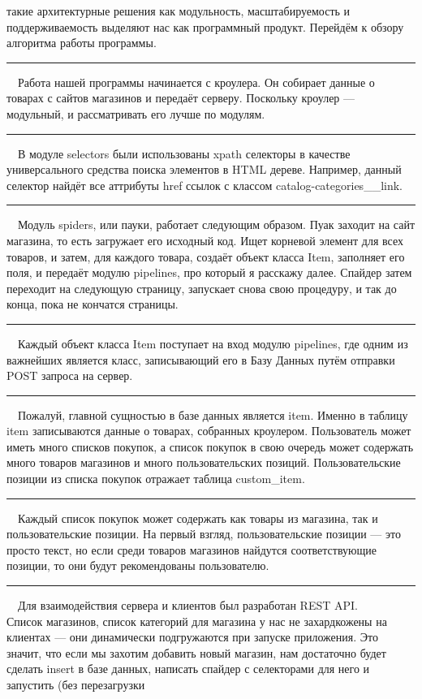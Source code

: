 \documentclass[12pt]{article}
\renewcommand{\line}{\noindent\rule{\textwidth}{1pt}}
\begin{document}
такие архитектурные решения как модульность, масштабируемость и
поддерживаемость выделяют нас как программный продукт. Перейдём к обзору
алгоритма работы программы.\\
\line\
\kir\ Работа нашей программы начинается с кроулера. Он собирает данные о товарах с
сайтов магазинов и передаёт серверу. Поскольку кроулер --- модульный, и
рассматривать его лучше по модулям.\\
\line\
\kir\ В модуле selectors были использованы xpath селекторы в качестве
универсального средства поиска элементов в HTML дереве. Например, данный
селектор найдёт все аттрибуты href ссылок с классом {\scriptsize
catalog-categories\_\_link}.\\
\line\
\kir\ Модуль spiders, или пауки, работает следующим образом. Пуак заходит на
сайт магазина, то есть загружает его исходный код. Ищет корневой элемент для
всех товаров, и затем, для каждого товара, создаёт объект класса Item,
заполняет его поля, и передаёт модулю pipelines, про который я расскажу далее.
Спайдер затем переходит на следующую страницу, запускает снова свою процедуру,
и так до конца, пока не кончатся страницы.\\
\line\
\kir\ Каждый объект класса Item поступает на вход модулю pipelines, где одним из
важнейших является класс, записывающий его в Базу Данных путём отправки
POST запроса на сервер.\\
\line\
\max\ Пожалуй, главной сущностью в базе данных является item. Именно в таблицу item
записываются данные о товарах, собранных кроулером. Пользователь может иметь
много списков покупок, а список покупок в свою очередь может содержать много
товаров магазинов и много пользовательских позиций.  Пользовательские позиции
из списка покупок отражает таблица custom\_item.\\
\line\
\max\ Каждый список покупок может содержать как товары из магазина, так и
пользовательские позиции. На первый взгляд, пользовательские позиции --- это
просто текст, но если среди товаров магазинов найдутся соответствующие
позиции, то они будут рекомендованы пользователю.\\
\line\
\max\ Для взаимодействия сервера и клиентов был разработан REST API.\\ Список
магазинов, список категорий для магазина у нас не захардкожены на клиентах —
они динамически подгружаются при запуске приложения. Это значит, что если мы
захотим добавить новый магазин, нам достаточно будет сделать insert в базе
данных, написать спайдер с селекторами для него и запустить (без перезагрузки
\end{document}
